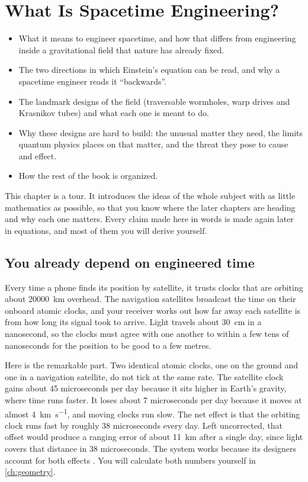 \chapter{What Is Spacetime Engineering?}\label{ch:what-is}

\begin{goals}
\begin{itemize}
\item What it means to engineer spacetime, and how that differs from
  engineering inside a gravitational field that nature has already fixed.
\item The two directions in which Einstein's equation can be read, and why
  a spacetime engineer reads it \enquote{backwards}.
\item The landmark designs of the field (traversable wormholes, warp drives
  and Krasnikov tubes) and what each one is meant to do.
\item Why these designs are hard to build: the unusual matter they need, the
  limits quantum physics places on that matter, and the threat they pose to
  cause and effect.
\item How the rest of the book is organized.
\end{itemize}
\end{goals}

This chapter is a tour. It introduces the ideas of the whole subject with as
little mathematics as possible, so that you know where the later chapters are
heading and why each one matters. Every claim made here in words is made again
later in equations, and most of them you will derive yourself.

\section{You already depend on engineered time}\label{sec:gps}

Every time a phone finds its position by satellite, it trusts clocks that are
orbiting about \SI{20000}{\kilo\metre} overhead. The navigation satellites
broadcast the time on their onboard atomic clocks, and your receiver works out
how far away each satellite is from how long its signal took to arrive. Light
travels about \SI{30}{\centi\metre} in a nanosecond, so the clocks must agree
with one another to within a few tens of nanoseconds for the position to be
good to a few metres.

Here is the remarkable part. Two identical atomic clocks, one on the ground and
one in a navigation satellite, do not tick at the same rate. The satellite
clock gains about 45 microseconds per day because it sits higher in Earth's
gravity, where time runs faster. It loses about 7 microseconds per day because
it moves at almost \SI{4}{\kilo\metre\per\second}, and moving clocks run slow.
The net effect is that the orbiting clock runs fast by roughly 38 microseconds
every day. Left uncorrected, that offset would produce a ranging error of about
\SI{11}{\kilo\metre} after a single day, since light covers that distance in
38 microseconds. The system works because its designers account for both
effects \parencite{Ashby2003}. You will calculate both numbers yourself in
\cref{ch:geometry}.

